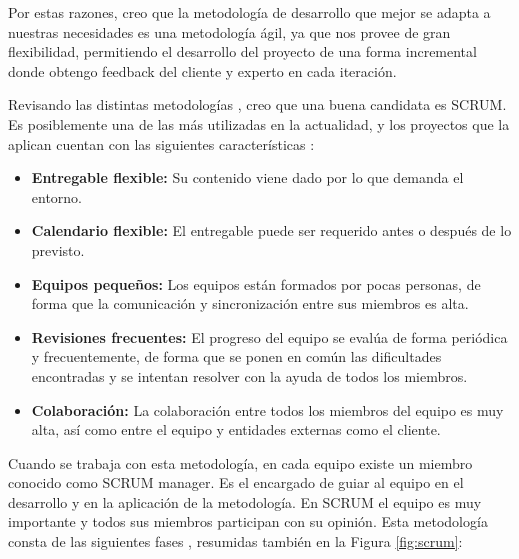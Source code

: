 Por estas razones, creo que la metodología de desarrollo que mejor se adapta a nuestras necesidades es una metodología ágil, ya que nos provee de gran flexibilidad, permitiendo el desarrollo del proyecto de una forma incremental donde obtengo feedback del cliente y experto en cada iteración.

Revisando las distintas metodologías \cite{despa2014comparative}, creo que una buena candidata es SCRUM. Es posiblemente una de las más utilizadas en la actualidad, y los proyectos que la aplican cuentan con las siguientes características \cite{schwaber1997scrum}:

\begin{itemize}
    \item \textbf{Entregable flexible:} Su contenido viene dado por lo que demanda el entorno. 
    \item \textbf{Calendario flexible:} El entregable puede ser requerido antes o después de lo previsto.
    \item \textbf{Equipos pequeños:} Los equipos están formados por pocas personas, de forma que la comunicación y sincronización entre sus miembros es alta. 
    \item \textbf{Revisiones frecuentes:} El progreso del equipo se evalúa de forma periódica y frecuentemente, de forma que se ponen en común las dificultades encontradas y se intentan resolver con la ayuda de todos los miembros.
    \item \textbf{Colaboración:} La colaboración entre todos los miembros del equipo es muy alta, así como entre el equipo y entidades externas como el cliente.
\end{itemize}

Cuando se trabaja con esta metodología, en cada equipo existe un miembro conocido como SCRUM manager. Es el encargado de guiar al equipo en el desarrollo y en la aplicación de la metodología. En SCRUM el equipo es muy importante y todos sus miembros participan con su opinión. Esta metodología consta de las siguientes fases \cite{schwaber1997scrum}, resumidas también en la Figura \ref{fig:scrum}:


